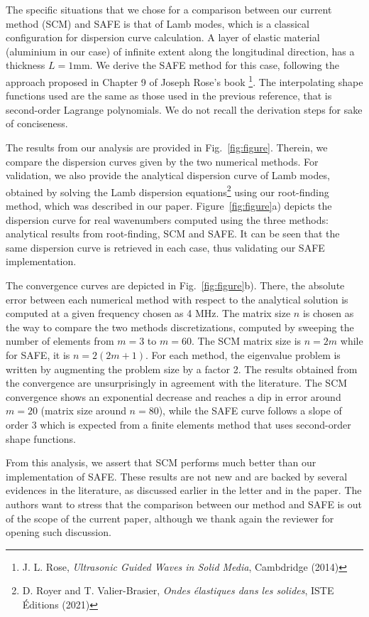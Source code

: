 \documentclass[11pt, a4paper]{article}
\begin{document}
The specific situations that we chose for a comparison between our current method (SCM) and SAFE is that of Lamb modes, which is a classical configuration for dispersion curve calculation. A layer of elastic material (aluminium in our case) of infinite extent along the longitudinal direction, has a thickness $L = 1$mm. We derive the SAFE method for this case, following the approach proposed in Chapter 9 of Joseph Rose's book \footnote{J. L. Rose, \textit{Ultrasonic Guided Waves in Solid Media}, Cambdridge (2014)}. The interpolating shape functions used are the same as those used in the previous reference, that is second-order Lagrange polynomials. We do not recall the derivation steps for sake of conciseness.

The results from our analysis are provided in Fig.~\ref{fig:figure}. Therein, we compare the dispersion curves given by the two numerical methods. For validation, we also provide the analytical dispersion curve of Lamb modes, obtained by solving the Lamb dispersion equations\footnote{D. Royer and T. Valier-Brasier, \textit{Ondes élastiques dans les solides}, ISTE Éditions (2021)} using our root-finding method, which was described in our paper. Figure~\ref{fig:figure}a) depicts the dispersion curve for real wavenumbers computed using the three methods: analytical results from root-finding, SCM and SAFE. It can be seen that the same dispersion curve is retrieved in each case, thus validating our SAFE implementation.

The convergence curves are depicted in Fig.~\ref{fig:figure}b). There, the absolute error between each numerical method with respect to the analytical solution is computed at a given frequency chosen as 4 MHz. The matrix size $n$ is chosen as the way to compare the two methods discretizations, computed by sweeping the number of elements from $m=3$ to $m=60$. The SCM matrix size is $n = 2m$ while for SAFE, it is $n = 2(2m + 1)$. For each method, the eigenvalue problem is written by augmenting the problem size by a factor 2. The results obtained from the convergence are unsurprisingly in agreement with the literature. The SCM convergence shows an exponential decrease and reaches a dip in error around $m = 20$ (matrix size around $n=80$), while the SAFE curve follows a slope of order 3 which is expected from a finite elements method that uses second-order shape functions. 

From this analysis, we assert that SCM performs much better than our implementation of SAFE. These results are not new and are backed by several evidences in the literature, as discussed earlier in the letter and in the paper. The authors want to stress that the comparison between our method and SAFE is out of the scope of the current paper, although we thank again the reviewer for opening such discussion.
\end{document}
